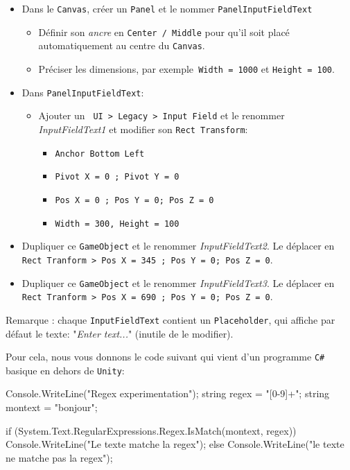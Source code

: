 \documentclass[a4paper,10pt]{article}
\newenvironment{solution}%
{\begin{tcolorbox}[breakable,colback=red!5!white,colframe=red!75!black,title=Solution]}%
{\end{tcolorbox}}
\newenvironment{boxcode}%
{\begin{tcolorbox}[breakable,colback=gray!5!white,colframe=black]}%
	{\end{tcolorbox}}
\begin{document}
\ifversionenseignant
\begin{solution}
	\begin{itemize}
		\item Dans le \texttt{Canvas}, créer un \texttt{Panel} et le nommer \texttt{PanelInputFieldText}
		\begin{itemize}
			\item Définir son \textit{ancre} en \texttt{Center / Middle} pour qu'il soit placé automatiquement au centre du \texttt{Canvas}.
			\item Préciser les dimensions, par exemple\texttt{ Width = 1000} et \texttt{Height = 100}.
		\end{itemize}
	\item Dans  \texttt{PanelInputFieldText}:
	\begin{itemize}
		\item Ajouter un \texttt{ UI > Legacy > Input Field} et le renommer \textit{InputFieldText1} et modifier son \texttt{Rect Transform}:
		\begin{itemize}
			\item \texttt{Anchor Bottom Left}
			\item \texttt{Pivot X = 0 ; Pivot Y = 0}
			\item \texttt{Pos X = 0 ; Pos Y = 0; Pos Z = 0}
			\item \texttt{Width = 300, Height = 100}
		\end{itemize}
		\end{itemize}
		\item Dupliquer ce \texttt{GameObject} et le renommer \textit{InputFieldText2}. Le déplacer en \texttt{Rect Tranform > Pos X = 345 ; Pos Y = 0; Pos Z = 0}.
		\item Dupliquer ce \texttt{GameObject} et le renommer \textit{InputFieldText3}. Le déplacer en \texttt{Rect Tranform > Pos X = 690 ; Pos Y = 0; Pos Z = 0}.		
		
	\end{itemize}

Remarque : chaque \texttt{InputFieldText} contient un \texttt{Placeholder}, qui affiche par défaut le texte: "\textit{Enter text...}" (inutile de le modifier).
\end{solution}	
\fi 

Pour cela, nous vous donnons le code suivant qui vient d'un programme \texttt{C\#} basique en dehors de \texttt{Unity}:

\begin{boxcode}
\begin{csharpsansbord}
Console.WriteLine("Regex experimentation");
string regex = "[0-9]+";
string montext = "bonjour";

if (System.Text.RegularExpressions.Regex.IsMatch(montext, regex))
	Console.WriteLine("Le texte matche la regex");
else
	Console.WriteLine("le texte ne matche pas la regex");

\end{csharpsansbord}
\end{boxcode}
\end{document}
